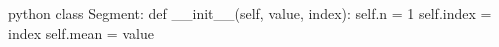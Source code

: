\begin{mintedbox}[samepage]{python}
class Segment:
    def __init__(self, value, index):
        self.n = 1
        self.index = index
        self.mean = value
\end{mintedbox}